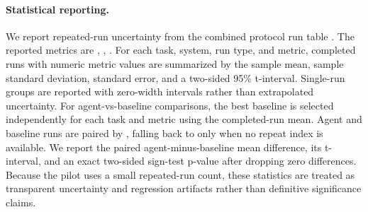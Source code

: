 \paragraph{Statistical reporting.}
We report repeated-run uncertainty from the combined protocol run table . The reported metrics are , , .
For each task, system, run type, and metric, completed runs with numeric metric values are summarized by the sample mean, sample standard deviation, standard error, and a two-sided 95\% t-interval. Single-run groups are reported with zero-width intervals rather than extrapolated uncertainty.
For agent-vs-baseline comparisons, the best baseline is selected independently for each task and metric using the completed-run mean. Agent and baseline runs are paired by , falling back to  only when no repeat index is available. We report the paired agent-minus-baseline mean difference, its t-interval, and an exact two-sided sign-test p-value after dropping zero differences.
Because the pilot uses a small repeated-run count, these statistics are treated as transparent uncertainty and regression artifacts rather than definitive significance claims.

